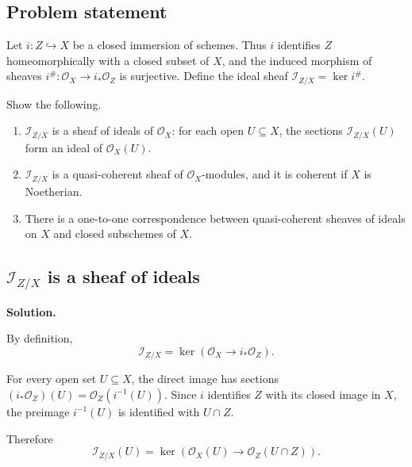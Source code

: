 
\subsection*{Problem statement}

Let \(i:Z\hookrightarrow X\) be a closed immersion of schemes. Thus
\(i\) identifies \(Z\) homeomorphically with a closed subset of \(X\),
and the induced morphism of sheaves
\(i^\#:\mathcal{O}_X\longrightarrow i_*\mathcal{O}_Z\) is surjective.
Define the ideal sheaf \(\mathcal{I}_{Z/X}=\ker i^\#\).

Show the following.

\begin{enumerate}[label=(\alph*)]
	\item \(\mathcal{I}_{Z/X}\) is a sheaf of ideals of \(\mathcal{O}_X\):
for each open \(U\subseteq X\), the sections \(\mathcal{I}_{Z/X}(U)\)
form an ideal of \(\mathcal{O}_X(U)\).
	
	\item \(\mathcal{I}_{Z/X}\) is a quasi-coherent sheaf of \(\mathcal{O}_X\)-modules, and it is coherent if \(X\) is Noetherian.
	
	\item There is a one-to-one correspondence between quasi-coherent sheaves of ideals on \(X\) and closed subschemes of \(X\).
\end{enumerate}

\subsection{\texorpdfstring{\(\mathcal{I}_{Z/X}\)}{I Z/X} is a sheaf of ideals}

\textbf{Solution.}

By definition,
\[
\mathcal{I}_{Z/X}
=
\ker\!\left(
\mathcal{O}_X\longrightarrow i_*\mathcal{O}_Z
\right).
\]

For every open set \(U\subseteq X\), the direct image has sections
\((i_*\mathcal{O}_Z)(U)=\mathcal{O}_Z(i^{-1}(U))\).
Since \(i\) identifies \(Z\) with its closed image in \(X\), the preimage
\(i^{-1}(U)\) is identified with \(U\cap Z\).

Therefore
\[
\mathcal{I}_{Z/X}(U)
=
\ker\!\left(
\mathcal{O}_X(U)
\longrightarrow
\mathcal{O}_Z(U\cap Z)
\right).
\]

